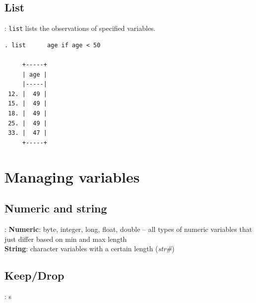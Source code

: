 \documentclass{beamer}
\begin{document}
\subsection{List}
\begin{frame}[fragile]{\secname : \subsecname}
\verb|list| lists the observations of specified variables. \\[4mm]
\small
\begin{verbatim}
. list      age if age < 50

     +-----+
     | age |
     |-----|
 12. |  49 |
 15. |  49 |
 18. |  49 |
 25. |  49 |
 33. |  47 |
     +-----+

\end{verbatim}
\end{frame}


\section{Managing variables}
\subsection{Numeric and string}
\begin{frame}[fragile]{\secname : \subsecname}
\textbf{Numeric}: byte, integer, long, float, double -- all types of numeric variables that just differ based on min and max length \\
\textbf{String}: character variables with a certain length (\textit{str\#})
\end{frame}

\subsection{Keep/Drop}
\begin{frame}[fragile]{\secname : \subsecname}
s
\end{frame}

\end{document}
